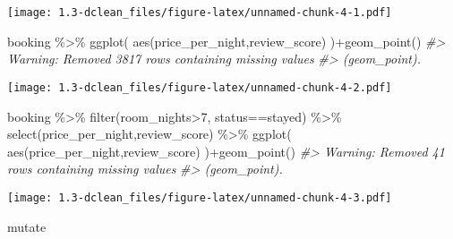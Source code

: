 \documentclass[
]{article}
\newenvironment{Shaded}{\begin{snugshade}}{\end{snugshade}}
\newcommand{\CommentTok}[1]{\textcolor[rgb]{0.56,0.35,0.01}{\textit{#1}}}
\newcommand{\DecValTok}[1]{\textcolor[rgb]{0.00,0.00,0.81}{#1}}
\newcommand{\FunctionTok}[1]{\textcolor[rgb]{0.00,0.00,0.00}{#1}}
\newcommand{\NormalTok}[1]{#1}
\newcommand{\SpecialCharTok}[1]{\textcolor[rgb]{0.00,0.00,0.00}{#1}}
\newcommand{\StringTok}[1]{\textcolor[rgb]{0.31,0.60,0.02}{#1}}
\begin{document}
\texttt{[image: 1.3-dclean\_files/figure-latex/unnamed-chunk-4-1.pdf]}

\begin{Shaded}
\begin{Highlighting}[]

\NormalTok{booking }\SpecialCharTok{\%\textgreater{}\%} 
  \FunctionTok{ggplot}\NormalTok{(}
    \FunctionTok{aes}\NormalTok{(price\_per\_night,review\_score)}
\NormalTok{  )}\SpecialCharTok{+}\FunctionTok{geom\_point}\NormalTok{()}
\CommentTok{\#\textgreater{} Warning: Removed 3817 rows containing missing values}
\CommentTok{\#\textgreater{} (geom\_point).}
\end{Highlighting}
\end{Shaded}

\texttt{[image: 1.3-dclean\_files/figure-latex/unnamed-chunk-4-2.pdf]}

\begin{Shaded}
\begin{Highlighting}[]

\NormalTok{booking }\SpecialCharTok{\%\textgreater{}\%} 
  \FunctionTok{filter}\NormalTok{(room\_nights}\SpecialCharTok{\textgreater{}}\DecValTok{7}\NormalTok{, status}\SpecialCharTok{==}\StringTok{\textquotesingle{}stayed\textquotesingle{}}\NormalTok{) }\SpecialCharTok{\%\textgreater{}\%} 
  \FunctionTok{select}\NormalTok{(price\_per\_night,review\_score) }\SpecialCharTok{\%\textgreater{}\%} 
  \FunctionTok{ggplot}\NormalTok{(}
    \FunctionTok{aes}\NormalTok{(price\_per\_night,review\_score)}
\NormalTok{  )}\SpecialCharTok{+}\FunctionTok{geom\_point}\NormalTok{()}
\CommentTok{\#\textgreater{} Warning: Removed 41 rows containing missing values}
\CommentTok{\#\textgreater{} (geom\_point).}
\end{Highlighting}
\end{Shaded}

\texttt{[image: 1.3-dclean\_files/figure-latex/unnamed-chunk-4-3.pdf]}

mutate
\end{document}

